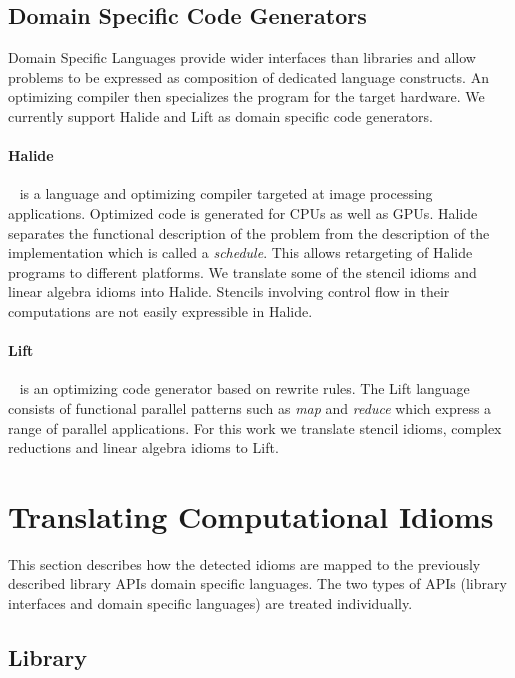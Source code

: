     \subsection{Domain Specific Code Generators}
    Domain Specific Languages provide wider interfaces than libraries and allow
    problems to be expressed as composition of dedicated language constructs.
    An optimizing compiler then specializes the program for the target hardware.
    We currently support Halide and Lift as domain specific code generators.

    \paragraph{Halide}~\cite{Ragan-Kelley2013Halide} is a language and
    optimizing compiler targeted at image processing applications.
    Optimized code is generated for CPUs as well as GPUs.
    Halide separates the functional description of the problem from the
    description of the implementation which is called a \emph{schedule}.
    This allows retargeting of Halide programs to different platforms.
    We translate some of the stencil idioms and linear algebra idioms into
    Halide.
    Stencils involving control flow in their computations are not easily
    expressible in Halide.

    \paragraph{Lift}~\cite{steuwer15rewrite, SteuwerRD17, HagedornSSGD18} is an
    optimizing code generator based on rewrite rules.
    The Lift language consists of functional parallel patterns such as
    \emph{map} and \emph{reduce} which  express a range of parallel
    applications.
    For this work we translate stencil idioms, complex reductions and linear
    algebra idioms to Lift.

\section{Translating Computational Idioms}

    This section describes how the detected idioms are mapped to the previously
    described library APIs domain specific languages.
    The two types of APIs (library interfaces and domain specific languages) are
    treated individually.

\subsection{Library}

